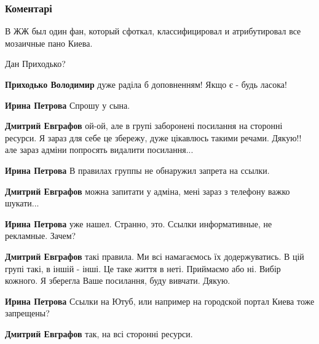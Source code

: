  
 
 
 
 
\subsubsection{Коментарі}

\begin{itemize} %
В ЖЖ был один фан, который сфоткал, классифицировал и атрибутировал все мозаичные пано Киева.

\begin{itemize} %
Дан Приходько?

\textbf{Приходько Володимир} дуже раділа б доповненням! Якщо є - будь ласока!

\textbf{Ирина Петрова} Спрошу у сына.

\textbf{Дмитрий Евграфов} ой-ой, але в групі заборонені посилання на сторонні ресурси. Я зараз для себе це збережу, дуже цікавлюсь такими речами. Дякую!! але зараз адміни попросять видалити посилання...

\textbf{Ирина Петрова} В правилах группы не обнаружил запрета на ссылки.

\textbf{Дмитрий Евграфов} можна запитати у адміна, мені зараз з телефону важко шукати...

\textbf{Ирина Петрова} уже нашел. Странно, это. Ссылки информативные, не рекламные. Зачем?

\textbf{Дмитрий Евграфов} такі правила. Ми всі намагаємось їх додержуватись. В цій групі такі, в іншій - інші. Це таке життя в неті. Приймаємо або ні. Вибір кожного. Я зберегла Ваше посилання, буду вивчати. Дякую.

\textbf{Ирина Петрова} Ссылки на Ютуб, или например на городской портал Киева тоже запрещены?

\textbf{Дмитрий Евграфов} так, на всі сторонні ресурси.
\end{itemize} %



\end{itemize}
